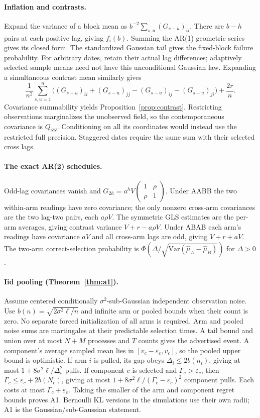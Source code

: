 \documentclass[sigconf,review,anonymous]{acmart}
\newcommand{\Var}{\mathrm{Var}}
\begin{document}
\paragraph{Inflation and contrasts.}
Expand the variance of a block mean as $b^{-2}\sum_{s,u}(G_{s-u})_{ii}$. There are $b-h$ pairs at each positive lag, giving $f_i(b)$. Summing the AR(1) geometric series gives its closed form. The standardized Gaussian tail gives the fixed-block failure probability. For arbitrary dates, retain their actual lag differences; adaptively selected sample means need not have this unconditional Gaussian law. Expanding a simultaneous contrast mean similarly gives
\[
\frac1{n^2}\sum_{s,u=1}^n
\big((G_{s-u})_{ii}+(G_{s-u})_{jj}-(G_{s-u})_{ij}-(G_{s-u})_{ji}\big)+\frac{2r}{n}.
\]
Covariance summability yields Proposition~\ref{prop:contrast}. Restricting observations marginalizes the unobserved field, so the contemporaneous covariance is $Q_{SS}$. Conditioning on all its coordinates would instead use the restricted full precision. Staggered dates require the same sum with their selected cross lags.

\paragraph{The exact AR(2) schedules.}
Odd-lag covariances vanish and $G_{2h}=a^hV\left(\begin{smallmatrix}1&\rho\\\rho&1\end{smallmatrix}\right)$. Under AABB the two within-arm readings have zero covariance; the only nonzero cross-arm covariances are the two lag-two pairs, each $a\rho V$. The symmetric GLS estimates are the per-arm averages, giving contrast variance $V+r-a\rho V$. Under ABAB each arm's readings have covariance $aV$ and all cross-arm lags are odd, giving $V+r+aV$. The two-arm correct-selection probability is $\Phi(\Delta/\sqrt{\Var(\hat\mu_A-\hat\mu_B)})$ for $\Delta>0$.

\paragraph{Iid pooling (Theorem~\ref{thm:a1}).}
Assume centered conditionally $\sigma^2$-sub-Gaussian independent observation noise. Use $b(n)=\sqrt{2\sigma^2\ell/n}$ and infinite arm or pooled bounds when their count is zero. No separate forced initialization of all arms is required. Arm and pooled noise sums are martingales at their predictable selection times. A tail bound and union over at most $N+M$ processes and $T$ counts gives the advertised event. A component's average sampled mean lies in $[v_c-\varepsilon_c,v_c]$, so the pooled upper bound is optimistic. If arm $i$ is pulled, its gap obeys $\Delta_i\le2b(n_i)$, giving at most $1+8\sigma^2\ell/\Delta_i^2$ pulls. If component $c$ is selected and $\Gamma_c>\varepsilon_c$, then $\Gamma_c\le\varepsilon_c+2b(N_c)$, giving at most $1+8\sigma^2\ell/(\Gamma_c-\varepsilon_c)^2$ component pulls. Each costs at most $\Gamma_c+\varepsilon_c$. Taking the smaller of the arm and component regret bounds proves A1. Bernoulli KL versions in the simulations use their own radii; A1 is the Gaussian/sub-Gaussian statement.
\end{document}
